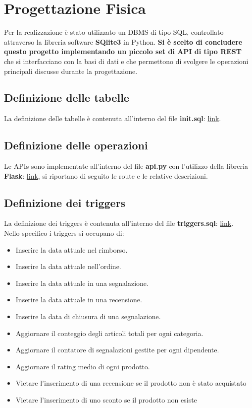 \section{Progettazione Fisica}

Per la realizzazione è stato utilizzato un DBMS di tipo SQL, controllato attraverso la libreria software \textbf{SQlite3} in Python. \textbf{Si è scelto di concludere questo progetto implementando un piccolo set di API di tipo REST} che si interfacciano con la basi di dati e che permettono di svolgere le operazioni principali discusse durante la progettazione. 

\subsection{Definizione delle tabelle}
La definizione delle tabelle è contenuta all'interno del file \textbf{init.sql}: \href{https://github.com/krosspile/ecommerce_database/blob/master/src/database/init.sql}{link}.

\subsection{Definizione delle operazioni}
Le APIs sono implementate all'interno del file \textbf{api.py} con l'utilizzo della libreria \textbf{Flask}: \href{https://github.com/krosspile/ecommerce_database/blob/master/src/api.py}{link}, si riportano di seguito le route e le relative descrizioni. 



\subsection{Definizione dei triggers}

La definizione dei triggers è contenuta all'interno del file \textbf{triggers.sql}: \href{https://github.com/krosspile/ecommerce_database/blob/master/src/database/triggers.sql}{link}.\\
Nello specifico i triggers si occupano di:
\begin{itemize}
    \item Inserire la data attuale nel rimborso.
    \item Inserire la data attuale nell'ordine.
    \item Inserire la data attuale in una segnalazione.
    \item Inserire la data attuale in una recensione.
    \item Inserire la data di chiusura di una segnalazione.
    \item Aggiornare il conteggio degli articoli totali per ogni categoria.
    \item Aggiornare il contatore di segnalazioni gestite per ogni dipendente.
    \item Aggiornare il rating medio di ogni prodotto.
    \item Vietare l'inserimento di una recensione se il prodotto non è stato acquistato
    \item Vietare l'inserimento di uno sconto se il prodotto non esiste
\end{itemize}

